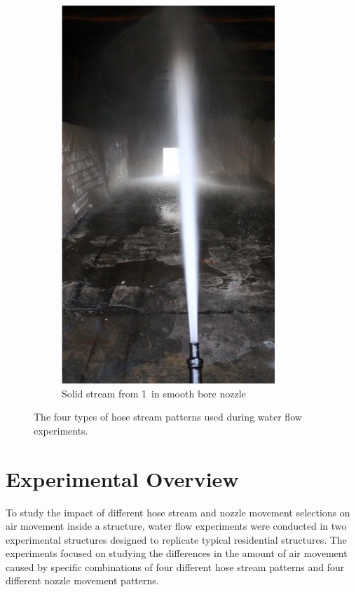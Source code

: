 \documentclass[12pt,oneside]{book}
\begin{document}
\begin{figure}[!ht]
\begin{subfigure}[b]{0.45\columnwidth}
		\includegraphics[width=0.75\columnwidth]{../Figures/Pictures/SB_70}
		\caption{Solid stream from 1~in smooth bore nozzle}
	\end{subfigure}
	\caption[Hose stream patterns used during experiments.]{The four types of hose stream patterns used during water flow experiments.}
	\label{fig:hose_streams}
\end{figure}

\clearpage

\chapter{Experimental Overview}
\label{chap:exp_overview}
To study the impact of different hose stream and nozzle movement selections on air movement inside a structure, water flow experiments were conducted in two experimental structures designed to replicate typical residential structures. The experiments focused on studying the differences in the amount of air movement caused by specific combinations of four different hose stream patterns and four different nozzle movement patterns.
\end{document}
